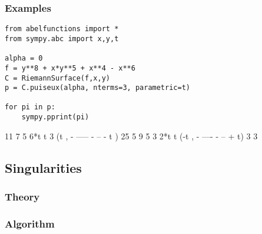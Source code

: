 


\subsubsection*{Examples}

\begin{lstlisting}
from abelfunctions import *
from sympy.abc import x,y,t

alpha = 0
f = y**8 + x*y**5 + x**4 - x**6
C = RiemannSurface(f,x,y)
p = C.puiseux(alpha, nterms=3, parametric=t)

for pi in p:
    sympy.pprint(pi)
\end{lstlisting}
\begin{pyoutput}
          11    7      
  5    6*t     t     3 
(t , - ----- - -- - t )
         25    5       
           9    5     
   3    2*t    t      
(-t , - ---- - -- + t)
         3     3      
\end{pyoutput}

\subsection{Singularities}

%
\subsubsection*{Theory}
%
%
\subsubsection*{Algorithm}
%
%
